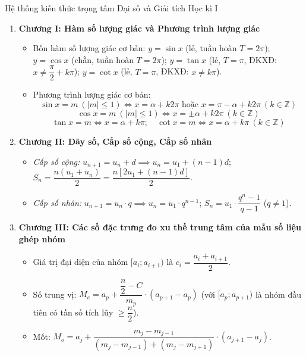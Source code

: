 \documentclass[12pt, a4paper]{article}
\begin{document}
\begin{pedabox}{Hệ thống kiến thức trọng tâm Đại số và Giải tích Học kì I}
    \begin{enumerate}
        \item \textbf{Chương I: Hàm số lượng giác và Phương trình lượng giác}
        \begin{itemize}
            \item Bốn hàm số lượng giác cơ bản: $y = \sin x$ (lẻ, tuần hoàn $T=2\pi$); $y = \cos x$ (chẵn, tuần hoàn $T=2\pi$); $y = \tan x$ (lẻ, $T=\pi$, ĐKXĐ: $x \neq \dfrac{\pi}{2} + k\pi$); $y = \cot x$ (lẻ, $T=\pi$, ĐKXĐ: $x \neq k\pi$).
            \item Phương trình lượng giác cơ bản:
            $$\sin x = m \ (|m| \le 1) \iff x = \alpha + k2\pi \text{ hoặc } x = \pi - \alpha + k2\pi \ (k \in \mathbb{Z})$$
            $$\cos x = m \ (|m| \le 1) \iff x = \pm \alpha + k2\pi \ (k \in \mathbb{Z})$$
            $$\tan x = m \iff x = \alpha + k\pi; \quad \cot x = m \iff x = \alpha + k\pi \ (k \in \mathbb{Z})$$
        \end{itemize}

        \item \textbf{Chương II: Dãy số, Cấp số cộng, Cấp số nhân}
        \begin{itemize}
            \item \textit{Cấp số cộng:} $u_{n+1} = u_n + d \implies u_n = u_1 + (n-1)d$; $S_n = \dfrac{n(u_1 + u_n)}{2} = \dfrac{n[2u_1 + (n-1)d]}{2}$.
            \item \textit{Cấp số nhân:} $u_{n+1} = u_n \cdot q \implies u_n = u_1 \cdot q^{n-1}$; $S_n = u_1 \cdot \dfrac{q^n - 1}{q - 1}$ ($q \neq 1$).
        \end{itemize}

        \item \textbf{Chương III: Các số đặc trưng đo xu thế trung tâm của mẫu số liệu ghép nhóm}
        \begin{itemize}
            \item Giá trị đại diện của nhóm $[a_i; a_{i+1})$ là $c_i = \dfrac{a_i + a_{i+1}}{2}$.
            \item Số trung vị: $M_e = a_p + \dfrac{\dfrac{n}{2} - C}{m_p} \cdot (a_{p+1} - a_p)$ (với $[a_p; a_{p+1})$ là nhóm đầu tiên có tần số tích lũy $\ge \dfrac{n}{2}$).
            \item Mốt: $M_o = a_j + \dfrac{m_j - m_{j-1}}{(m_j - m_{j-1}) + (m_j - m_{j+1})} \cdot (a_{j+1} - a_j)$.
        \end{itemize}


\end{enumerate}
\end{pedabox}
\end{document}
